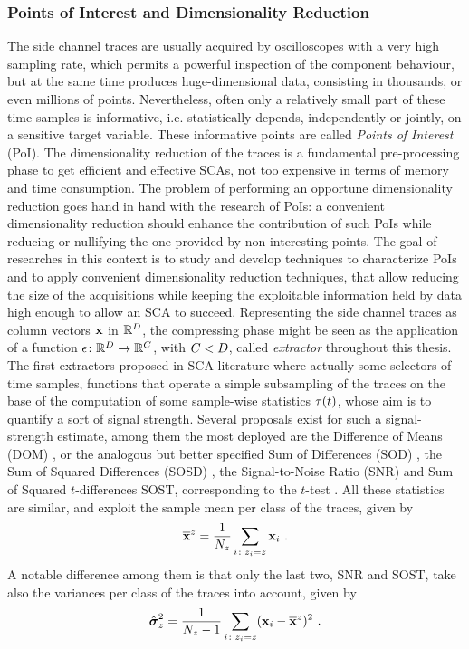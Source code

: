 \subsubsection{Points of Interest and Dimensionality Reduction}\label{sec:extractors}
The side channel traces are usually acquired by oscilloscopes with a very high sampling rate, which permits a powerful inspection of the component behaviour, but at the same time produces huge-dimensional data, consisting in thousands, or even millions of points. Nevertheless, often only a relatively small part of these time samples is informative, i.e. statistically depends, independently or jointly, on a sensitive target variable. These informative points are called \emph{Points of Interest} (PoI). The dimensionality reduction of the traces is a fundamental pre-processing phase to get efficient and effective SCAs, not too expensive in terms of memory and time consumption. The problem of performing an opportune dimensionality reduction goes hand in hand with the research of PoIs: a convenient dimensionality reduction should enhance the contribution of such PoIs while reducing or nullifying the one provided by non-interesting points. 
The goal of researches in this context is to study and develop techniques to characterize PoIs and to apply convenient dimensionality reduction techniques, that allow reducing the size of the acquisitions while keeping the exploitable information held by data high enough to allow an SCA to succeed.
Representing the side channel traces as column vectors ${\bf x}$ in $\mathbb{R}^D$, the compressing phase might be seen as the application of a function $\epsilon\colon \mathbb{R}^D\rightarrow \mathbb{R}^C$, with $C<D$, called {\em extractor} throughout this thesis. The first extractors proposed in SCA literature where actually some selectors of time samples, \ie functions that operate a simple subsampling of the traces on the base of the computation of some sample-wise statistics $\tau(t)$, whose aim is to quantify a sort of  signal strength. Several proposals exist for such a signal-strength estimate, among them the most deployed are the Difference of Means (DOM) \cite{Chari2003}, or the analogous but better specified Sum of Differences (SOD) \cite{Rechberger2005}, the Sum of Squared Differences (SOSD) \cite{gierlichs2006templates}, the Signal-to-Noise Ratio (SNR) \cite{mangard2008power,lomne2013behind} and  Sum of Squared $t$-differences SOST, corresponding to the $t$-test \cite{gierlichs2006templates}. All these statistics are similar, and exploit the sample mean per class of the traces, given by
\begin{equation}
\overline{\textbf{x}}^{z} = \frac{1}{N_{z}}\sum_{i\colon z_i=z} \textbf{x}_i \mbox{ .}
\end{equation} 
A notable difference among them is that only the last two, SNR and SOST, take also the variances per class of the traces into account, given by
\begin{equation}
\hat{\boldsymbol{\sigma}}^2_{z} = \frac{1}{N_{z}-1}\sum_{i\colon z_i=z} (\textbf{x}_i - \overline{\textbf{x}}^{z})^2 \mbox{ .}
\end{equation}

